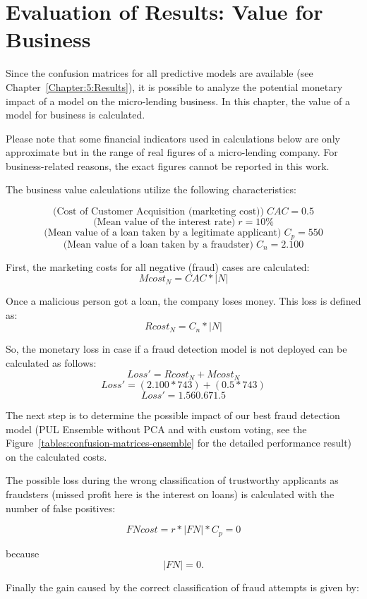 \chapter{Evaluation of Results: Value for Business}\label{Chapter:6}
Since the confusion matrices for all predictive models are available (see Chapter~\ref{Chapter:5:Results}), it is possible to analyze the potential monetary impact of a model on the micro-lending business. In this chapter, the value of a model for business is calculated.

Please note that some financial indicators used in calculations below are only approximate but in the range of real figures of a micro-lending company. For business-related reasons, the exact figures cannot be reported in this work.

The business value calculations utilize the following characteristics:

\[\textrm{(Cost of Customer Acquisition (marketing cost))} \; CAC = 0.5  \]
\[\textrm{(Mean value of the interest rate)}\; r = 10\%  \]
\[\textrm{(Mean value of a loan taken by a legitimate applicant)}\; C_p = 550  \]
\[\textrm{(Mean value of a loan taken by a fraudster)}\; C_n = 2.100  \]


First, the marketing costs for \textrm{all} negative (fraud) cases are calculated:
\[ Mcost_N = CAC * |N| \]

Once a malicious person got a loan, the company loses money. This loss is defined as:
\[ Rcost_N =   C_n * |N| \]

So, the monetary loss in case if a fraud detection model is not deployed can be calculated as follows:
\[ Loss' =  Rcost_N  +   Mcost_N  \]
\[ Loss' =  (2.100 * 743) + (0.5 * 743) \]
\[ Loss' =  1.560.671.5\]

The next step is to determine the possible impact of our best fraud detection model (PUL Ensemble without PCA and with custom voting, see the Figure~\ref{tables:confusion-matrices-ensemble} for the detailed performance result) on the calculated costs. 

The possible loss during the wrong classification of trustworthy applicants as fraudsters (missed profit here is the interest on loans) is calculated with the number of false positives:

\[ FNcost = r * |FN| * C_p = 0\]

because \[|FN| = 0.\]

Finally the gain caused by the correct classification of fraud attempts is given by:


